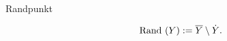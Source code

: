 \documentclass[class=article, crop=false]{standalone}
\begin{document}
\begin{zettel}{Randpunkt}
\begin{flashcard}[]{}
	\begin{definition}[Rand]
		\[
			\tx{ Rand}(Y) := \bar{Y}  \setminus \dot{Y}
		.\]

	\end{definition}
\end{flashcard}
\end{zettel}
\end{document}

